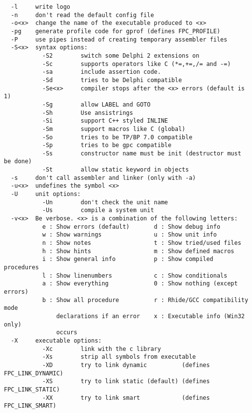 \documentclass{report}
\begin{document}
\begin{verbatim}
  -l     write logo
  -n     don't read the default config file
  -o<x>  change the name of the executable produced to <x>
  -pg    generate profile code for gprof (defines FPC_PROFILE)
  -P     use pipes instead of creating temporary assembler files
  -S<x>  syntax options:
           -S2        switch some Delphi 2 extensions on
           -Sc        supports operators like C (*=,+=,/= and -=)
           -sa        include assertion code.
           -Sd        tries to be Delphi compatible
           -Se<x>     compiler stops after the <x> errors (default is 1)
           -Sg        allow LABEL and GOTO
           -Sh        Use ansistrings
           -Si        support C++ styled INLINE
           -Sm        support macros like C (global)
           -So        tries to be TP/BP 7.0 compatible
           -Sp        tries to be gpc compatible
           -Ss        constructor name must be init (destructor must be done)
           -St        allow static keyword in objects
  -s     don't call assembler and linker (only with -a)
  -u<x>  undefines the symbol <x>
  -U     unit options:
           -Un        don't check the unit name
           -Us        compile a system unit
  -v<x>  Be verbose. <x> is a combination of the following letters:
           e : Show errors (default)       d : Show debug info
           w : Show warnings               u : Show unit info
           n : Show notes                  t : Show tried/used files
           h : Show hints                  m : Show defined macros
           i : Show general info           p : Show compiled procedures
           l : Show linenumbers            c : Show conditionals
           a : Show everything             0 : Show nothing (except errors)
           b : Show all procedure          r : Rhide/GCC compatibility mode
               declarations if an error    x : Executable info (Win32 only)
               occurs
  -X     executable options:
           -Xc        link with the c library
           -Xs        strip all symbols from executable
           -XD        try to link dynamic          (defines FPC_LINK_DYNAMIC)
           -XS        try to link static (default) (defines FPC_LINK_STATIC)
           -XX        try to link smart            (defines FPC_LINK_SMART)


\end{verbatim}
\end{document}
